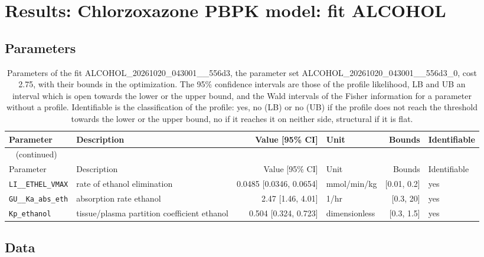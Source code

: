 \section{Results: Chlorzoxazone PBPK model: fit ALCOHOL}

\subsection{Parameters}

\begin{longtable}{llrlrl}
\caption{Parameters of the fit ALCOHOL\_20261020\_043001\_\_556d3, the parameter set ALCOHOL\_20261020\_043001\_\_556d3\_0, cost 2.75, with their bounds in the optimization. The 95\% confidence intervals are those of the profile likelihood, LB and UB an interval which is open towards the lower or the upper bound, and the Wald intervals of the Fisher information for a parameter without a profile. Identifiable is the classification of the profile: yes, no (LB) or no (UB) if the profile does not reach the threshold towards the lower or the upper bound, no if it reaches it on neither side, structural if it is flat.}\label{tab:parameters:ALCOHOL_20261020_043001__556d3} \\
\toprule
Parameter & Description & Value [95\% CI] & Unit & Bounds & Identifiable \\
\midrule
\endfirsthead
\multicolumn{6}{l}{\small\tablename~\thetable{} (continued)} \\
\toprule
Parameter & Description & Value [95\% CI] & Unit & Bounds & Identifiable \\
\midrule
\endhead
\bottomrule
\endlastfoot
\texttt{LI\_\_ETHEL\_VMAX} & rate of ethanol elimination & 0.0485 [0.0346, 0.0654] & mmol/min/kg & [0.01, 0.2] & yes \\
\texttt{GU\_\_Ka\_abs\_eth} & absorption rate ethanol & 2.47 [1.46, 4.01] & 1/hr & [0.3, 20] & yes \\
\texttt{Kp\_ethanol} & tissue/plasma partition coefficient ethanol & 0.504 [0.324, 0.723] & dimensionless & [0.3, 1.5] & yes \\
\end{longtable}

\subsection{Data}

